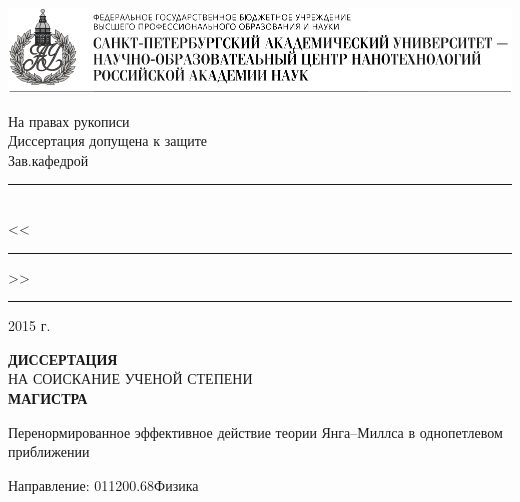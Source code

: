 
\begin{titlepage}
\begin{center}
\vspace*{-1cm}
\includegraphics[width=\textwidth]{img/logo.png}

\vspace{1cm}
\begin{flushright}
	\begin{minipage}{0.45\textwidth}
		\begin{center}
На правах рукописи\\
Диссертация допущена к защите\\
Зав.кафедрой\\[2mm]
\rule{5cm}{0.5pt}\\
<<\rule{0.7cm}{0.5pt}>> \rule{2.5cm}{0.5pt}  2015 г.
		\end{center}
	\end{minipage}
\end{flushright}

\vspace{2cm}
{\bf ДИССЕРТАЦИЯ}\\
НА СОИСКАНИЕ УЧЕНОЙ СТЕПЕНИ\\
{\bf МАГИСТРА}

\vspace{1cm}
{\Large Перенормированное эффективное действие теории Янга--Миллса в однопетлевом приближении}\\
\vspace{1cm}
\begin{flushleft}
Направление: 011200.68\hspace{0.7cm}Физика

\vspace{1cm}


\end{flushleft}
\end{center}
\end{titlepage}
